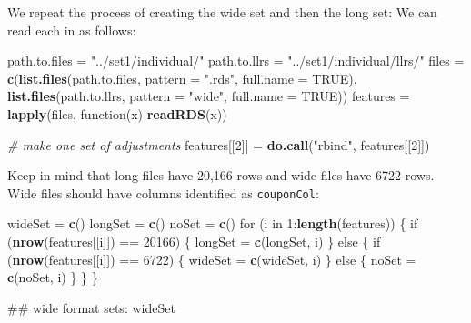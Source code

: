 \documentclass[10pt]{report}
\newenvironment{Shaded}{}{}
\newcommand{\KeywordTok}[1]{\textcolor[rgb]{0.00,0.44,0.13}{\textbf{{#1}}}}
\newcommand{\DataTypeTok}[1]{\textcolor[rgb]{0.56,0.13,0.00}{{#1}}}
\newcommand{\DecValTok}[1]{\textcolor[rgb]{0.25,0.63,0.44}{{#1}}}
\newcommand{\StringTok}[1]{\textcolor[rgb]{0.25,0.44,0.63}{{#1}}}
\newcommand{\CommentTok}[1]{\textcolor[rgb]{0.38,0.63,0.69}{\textit{{#1}}}}
\newcommand{\OtherTok}[1]{\textcolor[rgb]{0.00,0.44,0.13}{{#1}}}
\newcommand{\NormalTok}[1]{{#1}}
\begin{document}
We repeat the process of creating the wide set and then the long set: We
can read each in as follows:

\begin{Shaded}
\begin{Highlighting}[]
\NormalTok{path.to.files =}\StringTok{ "../set1/individual/"}
\NormalTok{path.to.llrs =}\StringTok{ "../set1/individual/llrs/"}
\NormalTok{files =}\StringTok{ }\KeywordTok{c}\NormalTok{(}\KeywordTok{list.files}\NormalTok{(path.to.files, }\DataTypeTok{pattern =} \StringTok{".rds"}\NormalTok{, }\DataTypeTok{full.name =} \OtherTok{TRUE}\NormalTok{), }\KeywordTok{list.files}\NormalTok{(path.to.llrs, }
    \DataTypeTok{pattern =} \StringTok{"wide"}\NormalTok{, }\DataTypeTok{full.name =} \OtherTok{TRUE}\NormalTok{))}
\NormalTok{features =}\StringTok{ }\KeywordTok{lapply}\NormalTok{(files, function(x) }\KeywordTok{readRDS}\NormalTok{(x))}

\CommentTok{# make one set of adjustments}
\NormalTok{features[[}\DecValTok{2}\NormalTok{]] =}\StringTok{ }\KeywordTok{do.call}\NormalTok{(}\StringTok{"rbind"}\NormalTok{, features[[}\DecValTok{2}\NormalTok{]])}
\end{Highlighting}
\end{Shaded}

Keep in mind that long files have 20,166 rows and wide files have 6722
rows. Wide files should have columns identified as \verb!couponCol!:

\begin{Shaded}
\begin{Highlighting}[]
\NormalTok{wideSet =}\StringTok{ }\KeywordTok{c}\NormalTok{()}
\NormalTok{longSet =}\StringTok{ }\KeywordTok{c}\NormalTok{()}
\NormalTok{noSet =}\StringTok{ }\KeywordTok{c}\NormalTok{()}
\NormalTok{for (i in }\DecValTok{1}\NormalTok{:}\KeywordTok{length}\NormalTok{(features)) \{}
    \NormalTok{if (}\KeywordTok{nrow}\NormalTok{(features[[i]]) ==}\StringTok{ }\DecValTok{20166}\NormalTok{) \{}
        \NormalTok{longSet =}\StringTok{ }\KeywordTok{c}\NormalTok{(longSet, i)}
    \NormalTok{\} else \{}
        \NormalTok{if (}\KeywordTok{nrow}\NormalTok{(features[[i]]) ==}\StringTok{ }\DecValTok{6722}\NormalTok{) \{}
            \NormalTok{wideSet =}\StringTok{ }\KeywordTok{c}\NormalTok{(wideSet, i)}
        \NormalTok{\} else \{}
            \NormalTok{noSet =}\StringTok{ }\KeywordTok{c}\NormalTok{(noSet, i)}
        \NormalTok{\}}
    \NormalTok{\}}
\NormalTok{\}}

\NormalTok{## wide format sets:}
\NormalTok{wideSet}
\end{Highlighting}
\end{Shaded}
\end{document}
